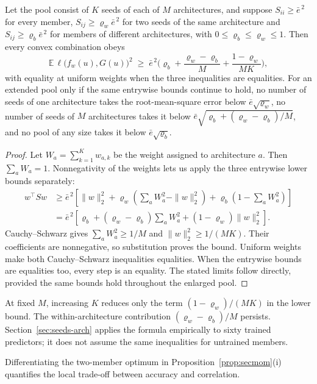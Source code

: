 \begin{theorem}\label{thm:blockfloor}
Let the pool consist of $K$ seeds of each of $M$ architectures, and suppose
$S_{ii}\ge\bar e^{\,2}$ for every member, $S_{ij}\ge\varrho_w\bar e^{\,2}$
for two seeds of the same architecture and $S_{ij}\ge\varrho_b\bar e^{\,2}$
for members of different architectures, with $0\le\varrho_b\le\varrho_w\le1$.
Then every convex combination obeys
\[
\mathbb E\,\ell\big(f_w(u),G(u)\big)^2\;\ge\;\bar e^{\,2}\Big(\varrho_b
+\frac{\varrho_w-\varrho_b}{M}+\frac{1-\varrho_w}{MK}\Big),
\]
with equality at uniform weights when the three inequalities are equalities.
For an extended pool only if the same entrywise bounds continue to hold, no number of seeds of one architecture takes the
root-mean-square error below $\bar e\sqrt{\varrho_w}$, no number of seeds of
$M$ architectures takes it below
$\bar e\sqrt{\varrho_b+(\varrho_w-\varrho_b)/M}$, and no pool of any size
takes it below $\bar e\sqrt{\varrho_b}$.
\end{theorem}
\begin{proof}
Let $W_a=\sum_{k=1}^K w_{a,k}$ be the weight assigned to architecture $a$.
Then $\sum_aW_a=1$. Nonnegativity of the weights lets us apply the three
entrywise lower bounds separately:
\begin{align*}
w^\top Sw
&\ge \bar e^{\,2}\left[
 \|w\|_2^2+\varrho_w\left(\sum_aW_a^2-\|w\|_2^2\right)
 +\varrho_b\left(1-\sum_aW_a^2\right)\right]\\
&=\bar e^{\,2}\left[
 \varrho_b+(\varrho_w-\varrho_b)\sum_aW_a^2
 +(1-\varrho_w)\|w\|_2^2\right].
\end{align*}
Cauchy--Schwarz gives $\sum_aW_a^2\ge1/M$ and
$\|w\|_2^2\ge1/(MK)$. Their coefficients are nonnegative, so substitution
proves the bound. Uniform weights make both Cauchy--Schwarz inequalities
equalities. When the entrywise bounds are equalities too, every step is
an equality. The stated limits follow directly, provided the same bounds
hold throughout the enlarged pool.
\end{proof}


At fixed $M$, increasing $K$ reduces only the term $(1-\varrho_w)/(MK)$ in the lower bound. The within-architecture contribution $(\varrho_w-\varrho_b)/M$ persists. Section~\ref{sec:seeds-arch} applies the formula empirically to sixty trained predictors; it does not assume the same inequalities for untrained members.

Differentiating the two-member optimum in Proposition~\ref{prop:secmom}(i)
quantifies the local trade-off between accuracy and correlation.

